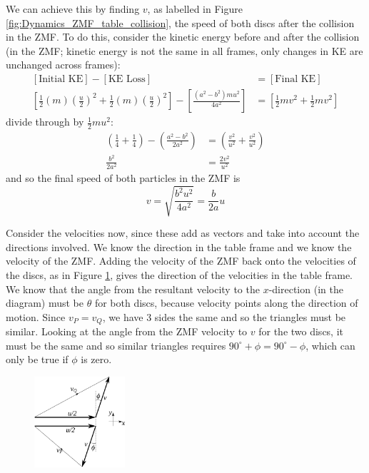 \begin{hint}
{\begin{enumerate}
We can achieve this by finding $v$, as labelled in Figure \ref{fig:Dynamics_ZMF_table_collision}, the speed of both discs after the collision in the ZMF. To do this, consider the kinetic energy before and after the collision (in the ZMF; kinetic energy is not the same in all frames, only changes in KE are unchanged across frames):
\begin{align*} \left[ \textrm{Initial KE} \right] - \left[ \textrm{KE Loss}\right] &= \left[ \textrm{Final KE} \right] \\
\left[ \frac{1}{2}(m)\left(\frac{u}{2}\right)^{2} + \frac{1}{2}(m)\left(\frac{u}{2}\right)^{2} \right] - \left[\frac{(a^{2} - b^{2})mu^{2}}{4a^{2}}\right] &= \left[ \frac{1}{2}mv^{2} + \frac{1}{2}mv^{2}\right]\end{align*}
divide through by $\frac{1}{2}mu^{2}$:
\begin{align*} \left( \frac{1}{4} + \frac{1}{4} \right) - \left( \frac{a^{2} - b^{2}}{2a^{2}} \right) &= \left( \frac{v^{2}}{u^{2}} + \frac{v^{2}}{u^{2}} \right) \\
\frac{b^2}{2a^{2}} &= \frac{2v^{2}}{u^{2}} \end{align*}
and so the final speed of both particles in the ZMF is
\begin{equation*} v = \sqrt{\frac{b^{2}u^{2}}{4a^{2}}} = \frac{b}{2a} u \end{equation*}

Consider the velocities now, since these add as vectors and take into account the directions involved. We know the direction in the table frame and we know the velocity of the ZMF. Adding the velocity of the ZMF back onto the velocities of the discs, as in Figure \ref{fig:Dynamics_ZMF_velocity_add}, gives the direction of the velocities in the table frame. We know that the angle from the resultant velocity to the $x$-direction (in the diagram) must be $\theta$ for both discs, because velocity points along the direction of motion. Since $v_{P} = v_{Q}$, we have 3 sides the same and so the triangles must be similar. Looking at the angle from the ZMF velocity to $v$ for the two discs, it must be the same and so similar triangles requires $90^{\circ} + \phi = 90^{\circ} - \phi$, which can only be true if $\phi$ is zero.

\begin{figure}[h]
\centering
\includegraphics[width=0.3\textwidth]{../../../figures/Dynamics_ZMF_velocity_add.svg}
\caption{}
\label{fig:Dynamics_ZMF_velocity_add}
\end{figure}


\end{enumerate}}
\end{hint}

